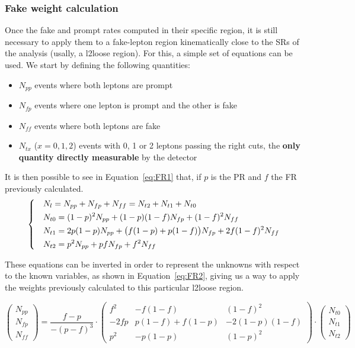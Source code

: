 \documentclass[a4paper, 10pt, openright]{report}
\begin{document}
\subsubsection*{Fake weight calculation}

Once the fake and prompt rates computed in their specific region, it is still necessary to apply them to a fake-lepton region kinematically close to the \acp{SR} of the analysis (usally, a l2loose region). For this, a simple set of equations can be used. We start by defining the following quantities:

\begin{itemize}
\item $N_{pp}$ events where both leptons are prompt
\item $N_{fp}$ events where one lepton is prompt and the other is fake
\item $N_{ff}$ events where both leptons are fake
\item $N_{tx}$ ($x = 0,1,2$) events with 0, 1 or 2 leptons passing the right cuts, the \textbf{only quantity directly measurable} by the detector
\end{itemize}

It is then possible to see in Equation~\ref{eq:FR1} that, if $p$ is the \ac{PR} and $f$ the \ac{FR} previously calculated.
\begin{equation}
\label{eq:FR1}
\begin{dcases}
&N_l = N_{pp} + N_{fp} + N_{ff} = N_{t2} + N_{t1} + N_{t0} \\
& N_{t0} = (1-p)^2N_{pp} + (1-p)(1-f)N_{fp}+(1-f)^2N_{ff} \\
& N_{t1} = 2p(1-p)N_{pp} + \big(f(1-p)+p(1-f)\big)N_{fp}+2f(1-f)^2N_{ff} \\
& N_{t2} = p^2N_{pp} + pfN_{fp}+f^2N_{ff}
\end{dcases}
\end{equation}

These equations can be inverted in order to represent the unknowns with respect to the known variables, as shown in Equation~\ref{eq:FR2}, giving us a way to apply the weights previously calculated to this particular l2loose region.

\begin{equation}
\label{eq:FR2}
\begin{pmatrix}
N_{pp} \\ N_{fp} \\ N_{ff}
\end{pmatrix} = \frac{f-p}{-(p-f)^3} \cdot 
\begin{pmatrix}
f^2 & -f(1-f) & (1-f)^2 \\ -2fp & p(1-f)+f(1-p) & -2(1-p)(1-f) \\ p^2 & -p(1-p) & (1-p)^2
\end{pmatrix} \cdot 
\begin{pmatrix}
N_{t0} \\ N_{t1} \\ N_{t2}
\end{pmatrix}
\end{equation}
\end{document}
